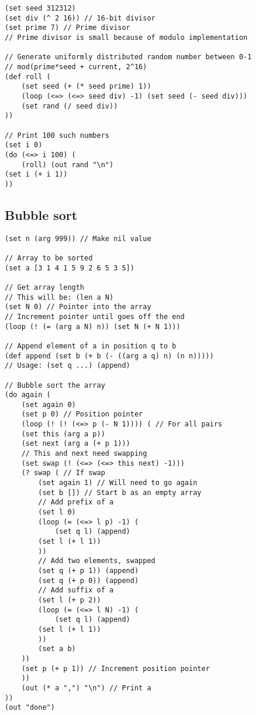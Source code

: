\documentclass[aip,jcp,reprint,footinbib]{revtex4-1}
\begin{document}
\begin{lstlisting}[language=psll,aboveskip=3mm,belowskip=3mm]
(set seed 312312)
(set div (^ 2 16)) // 16-bit divisor
(set prime 7) // Prime divisor
// Prime divisor is small because of modulo implementation

// Generate uniformly distributed random number between 0-1
// mod(prime*seed + current, 2^16)
(def roll (
    (set seed (+ (* seed prime) 1))
    (loop (<=> (<=> seed div) -1) (set seed (- seed div)))
    (set rand (/ seed div))
))

// Print 100 such numbers
(set i 0)
(do (<=> i 100) (
    (roll) (out rand "\n")
(set i (+ i 1))
))
\end{lstlisting}

\subsection{Bubble sort}

\begin{lstlisting}[language=psll,aboveskip=3mm,belowskip=3mm]
(set n (arg 999)) // Make nil value

// Array to be sorted
(set a [3 1 4 1 5 9 2 6 5 3 5])

// Get array length
// This will be: (len a N)
(set N 0) // Pointer into the array
// Increment pointer until goes off the end
(loop (! (= (arg a N) n)) (set N (+ N 1)))

// Append element of a in position q to b
(def append (set b (+ b (- ((arg a q) n) (n n)))))
// Usage: (set q ...) (append)

// Bubble sort the array
(do again (
    (set again 0)
    (set p 0) // Position pointer
    (loop (! (! (<=> p (- N 1)))) ( // For all pairs
    (set this (arg a p))
    (set next (arg a (+ p 1)))
    // This and next need swapping
    (set swap (! (<=> (<=> this next) -1)))
    (? swap ( // If swap
        (set again 1) // Will need to go again
        (set b []) // Start b as an empty array
        // Add prefix of a
        (set l 0)
        (loop (= (<=> l p) -1) (
            (set q l) (append)
        (set l (+ l 1))
        ))
        // Add two elements, swapped
        (set q (+ p 1)) (append)
        (set q (+ p 0)) (append)
        // Add suffix of a
        (set l (+ p 2))
        (loop (= (<=> l N) -1) (
            (set q l) (append)
        (set l (+ l 1))
        ))
        (set a b)
    ))
    (set p (+ p 1)) // Increment position pointer
    ))
    (out (* a ",") "\n") // Print a
))
(out "done")
\end{lstlisting}
\end{document}
